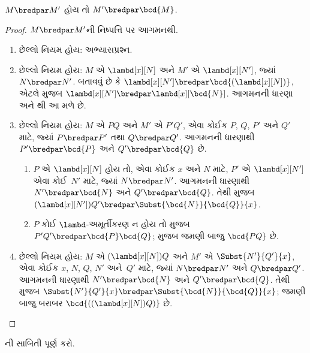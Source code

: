 \begin{lem}
  $M \bredpar M'$ હોય તો $M' \bredpar \bcd{M}$.
\end{lem}
\begin{proof}
  $M \bredpar M'$ની નિષ્પત્તિ પર આગમનથી.
  \begin{enumerate}
    \item છેલ્લો નિયમ  હોય: અભ્યાસપ્રશ્ન.
    \item છેલ્લો નિયમ  હોય:
      $M$ એ $\lambd[x][N]$ અને $M'$ એ $\lambd[x][N']$,
      જ્યાં $N \bredpar N'$. બતાવવું છે કે
      $\lambd[x][N'] \bredpar
      \bcd{(\lambd[x][N])}$, એટલે
       મુજબ
      $\lambd[x][N'] \bredpar \lambd[x][\bcd{N}]$.
      આગમનની ધારણા અને થી આ મળે છે.
    \item છેલ્લો નિયમ  હોય:
      $M$ એ $PQ$ અને $M'$ એ $P'Q'$,
      એવા કોઈક $P$, $Q$, $P'$ અને $Q'$ માટે, જ્યાં
      $P \bredpar P'$ તથા $Q \bredpar Q'$.
      આગમનની ધારણાથી $P' \bredpar \bcd{P}$
      અને $Q' \bredpar \bcd{Q}$ છે.
      \begin{enumerate}
        \item $P$ એ $\lambd[x][N]$ હોય તો,
          એવા કોઈક $x$ અને $N$ માટે,
          $P'$ એ $\lambd[x][N']$ એવા કોઈ~$N'$ માટે,
          જ્યાં $N \bredpar N'$. આગમનની ધારણાથી
          $N' \bredpar \bcd{N}$ અને
          $Q' \bredpar \bcd{Q}$. તેથી
           મુજબ
          $(\lambd[x][N'])Q' \bredpar
          \Subst{\bcd{N}}{\bcd{Q}}{x}$.
        \item $P$ કોઈ $\lambd$-અમૂર્તીકરણ ન હોય તો
           મુજબ
          $P'Q' \bredpar \bcd{P}\bcd{Q}$;
           મુજબ જમણી બાજુ
          $\bcd{PQ}$ છે.
      \end{enumerate}
    \item છેલ્લો નિયમ  હોય:
      $M$ એ $(\lambd[x][N])Q$ અને
      $M'$ એ $\Subst{N'}{Q'}{x}$,
      એવા કોઈક $x$, $N$, $Q$, $N'$ અને~$Q'$ માટે, જ્યાં
      $N \bredpar N'$ અને $Q \bredpar Q'$.
      આગમનની ધારણાથી $N' \bredpar \bcd{N}$
      અને $Q' \bredpar \bcd{Q}$. તેથી
       મુજબ
      $\Subst{N'}{Q'}{x} \bredpar
      \Subst{\bcd{N}}{\bcd{Q}}{x}$;
      જમણી બાજુ બરાબર
      $\bcd{((\lambd[x][N])Q)}$ છે.
  \end{enumerate}
\end{proof}

\begin{prob}
  ની સાબિતી પૂર્ણ કરો.
\end{prob}

